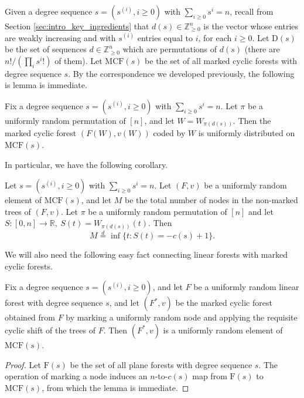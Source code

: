 Given a degree sequence $s=(s^{(i)}, i\ge 0)$ with $\sum_{i\ge 0}s^i=n$, recall from Section \ref{sec:intro_key_ingredients} that $d(s)\in\mathbb{Z}_{\ge 0}^n$ is the vector whose entries are weakly increasing and with $s^{(i)}$ entries equal to $i$, for each $i\ge 0$. 
Let $\mathrm{D}(s)$ be the set of sequences $d\in\mathbb{Z}_{\ge 0}^n$ which are permutations of $d(s)$ (there are $n!/(\prod_{i}s^i!)$ of them).
Let $\mathrm{MCF}(s)$ be the set of all marked cyclic forests with degree sequence $s$. By the correspondence we developed previously, the following is lemma is immediate. 

\begin{lem}\label{lem:bijection}
Fix a degree sequence $s=(s^{(i)}, i\ge 0)$ with $\sum_{i\ge 0}s^i=n$. Let $\pi$ be a uniformly random permutation of $[n]$, and let $W=W_{\pi(d(s))}$. Then the marked cyclic forest $(F(W),v(W))$ coded by $W$ is uniformly distributed on $\mathrm{MCF}(s)$. 
\end{lem}
In particular, we have the following corollary.
\begin{cor}
Let $s=(s^{(i)}, i\ge 0)$ with $\sum_{i\ge 0}s^i=n$. Let $(F,v)$ be a uniformly random element of $\mathrm{MCF}(s)$, and let $M$ be the total number of nodes in the non-marked trees of $(F,v)$. Let $\pi$ be a uniformly random permutation of $[n]$ and let $S:[0, n]\rightarrow \mathbb{R}, ~S(t)=W_{\pi(d(s))}(t)$. Then 
\begin{equation}\label{eqn:size of small trees}
M\overset{d}{=}\inf\{t: S(t)=-c(s)+1\}.
\end{equation}
\end{cor}
 We will also need the following easy fact connecting linear forests with marked cyclic forests.
\begin{lem}\label{lem:maps forest to marked cyclic forest}
Fix a degree sequence $s=(s^{(i)}, i\ge 0)$, and let $F$ be a uniformly random linear forest with degree sequence $s$, and let $(F^*,v)$ be the marked cyclic forest obtained from $F$ by marking a uniformly random node and applying the requisite cyclic shift of the trees of $F$. Then $(F^*,v)$ is a uniformly random element of $\mathrm{MCF}(s)$. 
\end{lem}
\begin{proof}
Let $\mathrm{F}(s)$ be the set of all plane forests with degree sequence $s$. 
The operation of marking a node induces an $n$-to-$c(s)$ map from $\mathrm{F}(s)$ to $\mathrm{MCF}(s)$, from which the lemma is immediate.
\end{proof}

